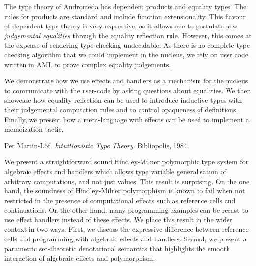 \documentclass[a4paper,UKenglish]{dagrep}
\begin{document}
The type theory of Andromeda has dependent products and equality types. The
rules for products are standard and include function extensionality. This
flavour of dependent type theory is very expressive, as it allows one to
postulate new \emph{judgemental equalities} through the equality reflection
rule. However, this comes at the expense of rendering type-checking
undecidable. As there is no complete type-checking algorithm that we could
implement in the nucleus, we rely on user code written in AML to prove complex
equality judgements.

We demonstrate how we use effects and handlers as a mechanism for the nucleus
to communicate with the user-code by asking questions about equalities. We then
showcase how equality reflection can be used to introduce inductive types with
their judgemental computation rules and to control opaqueness of definitions.
Finally, we present how a meta-language with effects can be used to implement a
memoization tactic.

\begin{thebibliography}{0}
 Per Martin-Löf. \emph{Intuitionistic Type Theory}. Bibliopolis, 1984.
\end{thebibliography}

\license

We present a straightforward sound Hindley-Milner polymorphic type system for algebraic effects and handlers which allows type variable generalisation of arbitrary computations, and not just values. This result is surprising. On the one hand, the soundness of Hindley-Milner polymorphism is known to fail when not restricted in the presence of computational effects such as reference cells and continuations. On the other hand, many programming examples can be recast to use effect handlers instead of these effects. We place this result in the wider context in two ways. First, we discuss the expressive difference between reference cells and programming with algebraic effects and handlers. Second, we present a parametric set-theoretic denotational semantics that highlights the smooth interaction of algebraic effects and polymorphism.

\license
\end{document}
